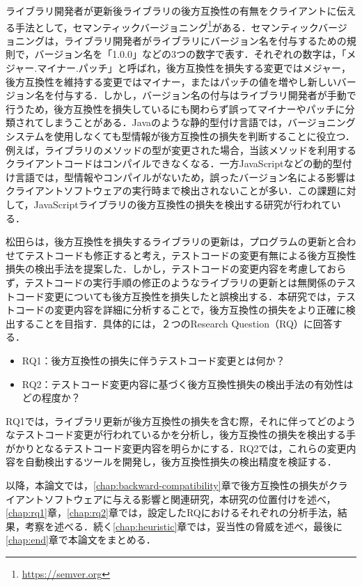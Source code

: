 \documentclass[11pt,dvipdfmx]{jreport}
\begin{document}
ライブラリ開発者が更新後ライブラリの後方互換性の有無をクライアントに伝える手法として，セマンティックバージョニング\footnote{\url{https://semver.org}}がある．セマンティックバージョニングは，ライブラリ開発者がライブラリにバージョン名を付与するための規則で，バージョン名を「1.0.0」などの3つの数字で表す．それぞれの数字は，「メジャー.マイナー.パッチ」と呼ばれ，後方互換性を損失する変更ではメジャー，後方互換性を維持する変更ではマイナー，またはパッチの値を増やし新しいバージョン名を付与する．しかし，バージョン名の付与はライブラリ開発者が手動で行うため，後方互換性を損失しているにも関わらず誤ってマイナーやパッチに分類されてしまうことがある．Javaのような静的型付け言語では，バージョニングシステムを使用しなくても型情報が後方互換性の損失を判断することに役立つ．例えば，ライブラリのメソッドの型が変更された場合，当該メソッドを利用するクライアントコードはコンパイルできなくなる．一方JavaScriptなどの動的型付け言語では，型情報やコンパイルがないため，誤ったバージョン名による影響はクライアントソフトウェアの実行時まで検出されないことが多い．この課題に対して，JavaScriptライブラリの後方互換性の損失を検出する研究が行われている．

松田らは，後方互換性を損失するライブラリの更新は，プログラムの更新と合わせてテストコードも修正すると考え，テストコードの変更有無による後方互換性損失の検出手法を提案した\cite{matsuda}．しかし，テストコードの変更内容を考慮しておらず，テストコードの実行手順の修正のようなライブラリの更新とは無関係のテストコード変更についても後方互換性を損失したと誤検出する．本研究では，テストコードの変更内容を詳細に分析することで，後方互換性の損失をより正確に検出することを目指す．具体的には，２つのResearch Question（RQ）に回答する．

\begin{itemize}
  \item RQ1：後方互換性の損失に伴うテストコード変更とは何か？
  \item RQ2：テストコード変更内容に基づく後方互換性損失の検出手法の有効性はどの程度か？
\end{itemize}

RQ1では，ライブラリ更新が後方互換性の損失を含む際，それに伴ってどのようなテストコード変更が行われているかを分析し，後方互換性の損失を検出する手がかりとなるテストコード変更内容を明らかにする．RQ2では，これらの変更内容を自動検出するツールを開発し，後方互換性損失の検出精度を検証する．

以降，本論文では，\ref{chap:backward-compatibility}章で後方互換性の損失がクライアントソフトウェアに与える影響と関連研究，本研究の位置付けを述べ，\ref{chap:rq1}章，\ref{chap:rq2}章では，設定したRQにおけるそれぞれの分析手法，結果，考察を述べる．続く\ref{chap:heuristic}章では，妥当性の脅威を述べ，最後に\ref{chap:end}章で本論文をまとめる．
\end{document}
